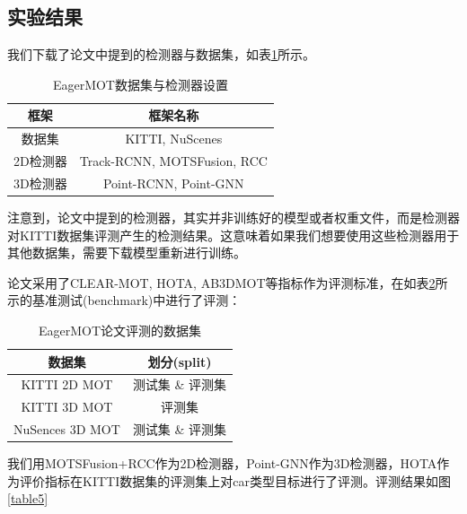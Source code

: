 \subsection{实验结果}

我们下载了论文中提到的检测器与数据集，如表\ref{table3}所示。

\begin{table}[htbp]
    \centering
    \caption{EagerMOT数据集与检测器设置}
    \begin{tabular}{c c}
    \toprule
    框架 & 框架名称 \\
    \midrule
    数据集 & KITTI, NuScenes\\
    2D检测器 & Track-RCNN, MOTSFusion, RCC\\
    3D检测器 & Point-RCNN, Point-GNN\\
    \bottomrule
    \end{tabular}
    \label{table3}
\end{table}

注意到，论文中提到的检测器，其实并非训练好的模型或者权重文件，而是检测器对KITTI数据集评测产生的检测结果。这意味着如果我们想要使用这些检测器用于其他数据集，需要下载模型重新进行训练。

论文采用了CLEAR-MOT, HOTA, AB3DMOT等指标作为评测标准，在如表\ref{table4}所示的基准测试(benchmark)中进行了评测：

\begin{table}[htbp]
    \centering
    \caption{EagerMOT论文评测的数据集}
    \begin{tabular}{c c}
    \toprule
    数据集 & 划分(split) \\
    \midrule
    KITTI 2D MOT & 测试集 \& 评测集\\
    KITTI 3D MOT & 评测集 \\
    NuSences 3D MOT & 测试集 \& 评测集\\
    \bottomrule
    \end{tabular}
    \label{table4}
\end{table}

我们用MOTSFusion+RCC作为2D检测器，Point-GNN作为3D检测器，HOTA作为评价指标在KITTI数据集的评测集上对car类型目标进行了评测。评测结果如图\ref{table5}

